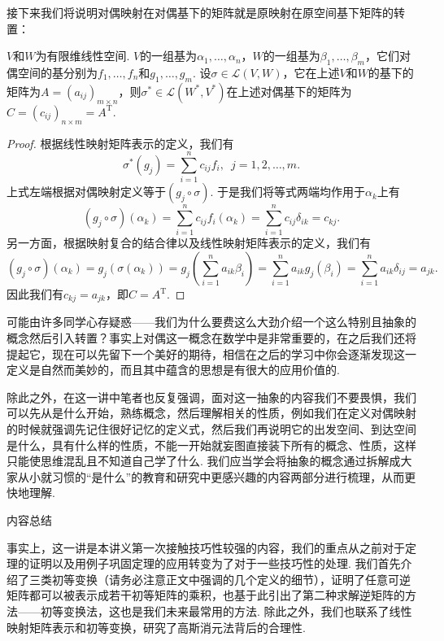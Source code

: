 接下来我们将说明对偶映射在对偶基下的矩阵就是原映射在原空间基下矩阵的转置：
\begin{theorem}
    $V$和$W$为有限维线性空间. $V$的一组基为$\alpha_1,\ldots,\alpha_n$，$W$的一组基为$\beta_1,\ldots,\beta_m$，它们对偶空间的基分别为$f_1,\ldots,f_n$和$g_1,\ldots,g_m$. 设$\sigma\in\mathcal{L}(V,W)$，它在上述$V$和$W$的基下的矩阵为$A=(a_{ij})_{m \times n}$，则$\sigma^*\in\mathcal{L}(W^*,V^*)$在上述对偶基下的矩阵为$C=(c_{ij})_{n \times m}=A^\mathrm{T}$.
\end{theorem}

\begin{proof}
    根据线性映射矩阵表示的定义，我们有
    \[\sigma^*(g_j)=\sum_{i=1}^nc_{ij}f_i,\enspace j=1,2,\ldots,m.\]
    上式左端根据对偶映射定义等于$(g_j\circ\sigma)$. 于是我们将等式两端均作用于$\alpha_k$上有
    \[(g_j\circ\sigma)(\alpha_k)=\sum_{i=1}^nc_{ij}f_i(\alpha_k)=\sum_{i=1}^nc_{ij}\delta_{ik}=c_{kj}.\]
    另一方面，根据映射复合的结合律以及线性映射矩阵表示的定义，我们有
    \[(g_j\circ\sigma)(\alpha_k)=g_j(\sigma(\alpha_k))=g_j\left(\sum_{i=1}^na_{ik}\beta_i\right)=\sum_{i=1}^na_{ik}g_j(\beta_i)=\sum_{i=1}^na_{ik}\delta_{ij}=a_{jk}.\]
    因此我们有$c_{kj}=a_{jk}$，即$C=A^\mathrm{T}$.
\end{proof}

可能由许多同学心存疑惑——我们为什么要费这么大劲介绍一个这么特别且抽象的概念然后引入转置？事实上对偶这一概念在数学中是非常重要的，在之后我们还将提起它，现在可以先留下一个美好的期待，相信在之后的学习中你会逐渐发现这一定义是自然而美妙的，而且其中蕴含的思想是有很大的应用价值的.

除此之外，在这一讲中笔者也反复强调，面对这一抽象的内容我们不要畏惧，我们可以先从是什么开始，熟练概念，然后理解相关的性质，例如我们在定义对偶映射的时候就强调先记住很好记忆的定义式，然后我们再说明它的出发空间、到达空间是什么，具有什么样的性质，不能一开始就妄图直接装下所有的概念、性质，这样只能使思维混乱且不知道自己学了什么. 我们应当学会将抽象的概念通过拆解成大家从小就习惯的``是什么''的教育和研究中更感兴趣的内容两部分进行梳理，从而更快地理解.

\vspace{2ex}
\centerline{\heiti \Large 内容总结}

事实上，这一讲是本讲义第一次接触技巧性较强的内容，我们的重点从之前对于定理的证明以及用例子巩固定理的应用转变为了对于一些技巧性的处理. 我们首先介绍了三类初等变换（请务必注意正文中强调的几个定义的细节），证明了任意可逆矩阵都可以被表示成若干初等矩阵的乘积，也基于此引出了第二种求解逆矩阵的方法——初等变换法，这也是我们未来最常用的方法. 除此之外，我们也联系了线性映射矩阵表示和初等变换，研究了高斯消元法背后的合理性.

